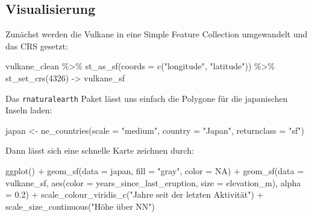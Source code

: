 \documentclass[
  ngerman,
]{article}
\newenvironment{Shaded}{\begin{snugshade}}{\end{snugshade}}
\newcommand{\AttributeTok}[1]{\textcolor[rgb]{0.77,0.63,0.00}{#1}}
\newcommand{\ConstantTok}[1]{\textcolor[rgb]{0.00,0.00,0.00}{#1}}
\newcommand{\DecValTok}[1]{\textcolor[rgb]{0.00,0.00,0.81}{#1}}
\newcommand{\FloatTok}[1]{\textcolor[rgb]{0.00,0.00,0.81}{#1}}
\newcommand{\FunctionTok}[1]{\textcolor[rgb]{0.00,0.00,0.00}{#1}}
\newcommand{\NormalTok}[1]{#1}
\newcommand{\OtherTok}[1]{\textcolor[rgb]{0.56,0.35,0.01}{#1}}
\newcommand{\SpecialCharTok}[1]{\textcolor[rgb]{0.00,0.00,0.00}{#1}}
\newcommand{\StringTok}[1]{\textcolor[rgb]{0.31,0.60,0.02}{#1}}
\begin{document}
\hypertarget{visualisierung}{%
\subsection{Visualisierung}\label{visualisierung}}

Zunächst werden die Vulkane in eine Simple Feature Collection umgewandelt und das CRS gesetzt:

\begin{Shaded}
\begin{Highlighting}[]
\NormalTok{vulkane\_clean }\SpecialCharTok{\%\textgreater{}\%}
  \FunctionTok{st\_as\_sf}\NormalTok{(}\AttributeTok{coords =} \FunctionTok{c}\NormalTok{(}\StringTok{"longitude"}\NormalTok{, }\StringTok{"latitude"}\NormalTok{)) }\SpecialCharTok{\%\textgreater{}\%}
  \FunctionTok{st\_set\_crs}\NormalTok{(}\DecValTok{4326}\NormalTok{) }\OtherTok{{-}\textgreater{}}\NormalTok{ vulkane\_sf}
\end{Highlighting}
\end{Shaded}

Das \texttt{rnaturalearth} Paket lässt uns einfach die Polygone für die japanischen Inseln laden:

\begin{Shaded}
\begin{Highlighting}[]
\NormalTok{japan }\OtherTok{\textless{}{-}} \FunctionTok{ne\_countries}\NormalTok{(}\AttributeTok{scale =} \StringTok{"medium"}\NormalTok{,}
                      \AttributeTok{country =} \StringTok{"Japan"}\NormalTok{,}
                      \AttributeTok{returnclass =} \StringTok{"sf"}\NormalTok{)}
\end{Highlighting}
\end{Shaded}

Dann lässt sich eine schnelle Karte zeichnen durch:

\begin{Shaded}
\begin{Highlighting}[]
\FunctionTok{ggplot}\NormalTok{() }\SpecialCharTok{+}
  \FunctionTok{geom\_sf}\NormalTok{(}\AttributeTok{data =}\NormalTok{ japan, }\AttributeTok{fill =} \StringTok{"gray"}\NormalTok{, }\AttributeTok{color =} \ConstantTok{NA}\NormalTok{) }\SpecialCharTok{+}
  \FunctionTok{geom\_sf}\NormalTok{(}\AttributeTok{data =}\NormalTok{ vulkane\_sf,}
          \FunctionTok{aes}\NormalTok{(}\AttributeTok{color =}\NormalTok{ years\_since\_last\_eruption,}
              \AttributeTok{size  =}\NormalTok{ elevation\_m),}
          \AttributeTok{alpha =} \FloatTok{0.2}\NormalTok{) }\SpecialCharTok{+}
  \FunctionTok{scale\_colour\_viridis\_c}\NormalTok{(}\StringTok{"Jahre seit der letzten Aktivität"}\NormalTok{) }\SpecialCharTok{+}
  \FunctionTok{scale\_size\_continuous}\NormalTok{(}\StringTok{"Höhe über NN"}\NormalTok{)}
\end{Highlighting}
\end{Shaded}
\end{document}
